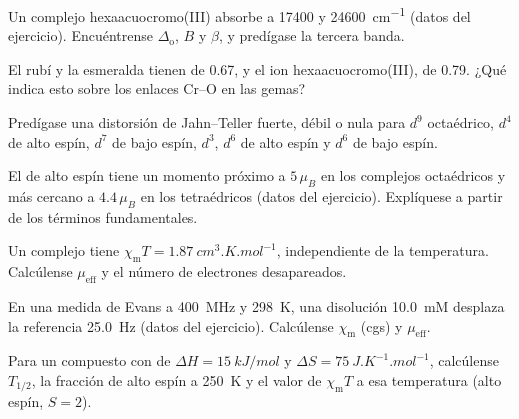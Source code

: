 \begin{exercise}[$\star\star$]\label{exo:b3:complex-spectra-magnetism:6}
Un complejo hexaacuocromo(III) absorbe a 17400 y \qty{24600}{cm^{-1}} (datos del
ejercicio). Encuéntrense $\Delta_{\mathrm o}$, $B$ y $\beta$, y predígase la tercera banda.
\end{exercise}

\begin{exercise}[$\star\star$]\label{exo:b3:complex-spectra-magnetism:7}
El rubí y la esmeralda tienen  de 0.67, y el ion hexaacuocromo(III),
de 0.79. ¿Qué indica esto sobre los enlaces Cr--O en las gemas?
\end{exercise}

\begin{exercise}[$\star\star$]\label{exo:b3:complex-spectra-magnetism:8}
Predígase una distorsión de Jahn--Teller fuerte, débil o nula para $d^9$ octaédrico, $d^4$ de alto
espín, $d^7$ de bajo espín, $d^3$, $d^6$ de alto espín y $d^6$ de bajo espín.
\end{exercise}

\begin{exercise}[$\star\star$]\label{exo:b3:complex-spectra-magnetism:9}
El  de alto espín tiene un momento próximo a $5\,\mu_B$ en los complejos octaédricos y más cercano a
$4.4\,\mu_B$ en los tetraédricos (datos del ejercicio). Explíquese a partir de los términos
fundamentales.
\end{exercise}

\begin{exercise}[$\star\star\star$]\label{exo:b3:complex-spectra-magnetism:10}
Un complejo tiene $\chi_{\mathrm m}T = \qty{1.87}{cm^3.K.mol^{-1}}$, independiente de la temperatura. Calcúlense $\mu_{\mathrm{eff}}$ y
el número de electrones desapareados.
\end{exercise}

\begin{exercise}[$\star\star\star$]\label{exo:b3:complex-spectra-magnetism:11}
En una medida de Evans a \qty{400}{MHz} y \qty{298}{K}, una disolución \qty{10.0}{mM} desplaza la
referencia \qty{25.0}{Hz} (datos del ejercicio). Calcúlense $\chi_{\mathrm m}$ (cgs) y $\mu_{\mathrm{eff}}$.
\end{exercise}

\begin{exercise}[$\star\star\star$]\label{exo:b3:complex-spectra-magnetism:12}
Para un compuesto con  de $\Delta H = \qty{15}{kJ/mol}$ y $\Delta S = \qty{75}{J.K^{-1}.mol^{-1}}$, calcúlense $T_{1/2}$,
la fracción de alto espín a \qty{250}{K} y el valor de $\chi_{\mathrm m}T$ a esa temperatura (alto espín, $S = 2$).
\end{exercise}

